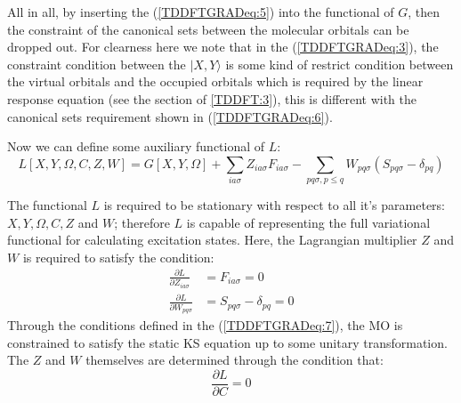 All in all, by inserting the (\ref{TDDFTGRADeq:5}) into the
functional of $G$, then the constraint of the canonical sets between
the molecular orbitals can be dropped out. For clearness here we
note that in the (\ref{TDDFTGRADeq:3}), the constraint condition
between the $|X,Y\rangle$ is some kind of restrict condition between
the virtual orbitals and the occupied orbitals which is required by
the linear response equation (see the section of \ref{TDDFT:3}),
this is different with the canonical sets requirement shown in
(\ref{TDDFTGRADeq:6}).

Now we can define some auxiliary functional of $L$:
\begin{equation}\label{}
L [X, Y, \Omega, C, Z ,W]  = G[X, Y, \Omega] +
\sum_{ia\sigma}Z_{ia\sigma}F_{ia\sigma} - \sum_{pq\sigma, p\leq
q}W_{pq\sigma}(S_{pq\sigma} - \delta_{pq})
\end{equation}

The functional $L$ is required to be stationary with respect to all
it's parameters: $X, Y, \Omega, C, Z$ and $W$; therefore $L$ is
capable of representing the full variational functional for
calculating excitation states. Here, the Lagrangian multiplier $Z$
and $W$ is required to satisfy the condition:
\begin{align}\label{TDDFTGRADeq:7}
\frac{\partial L}{\partial Z_{ia\sigma}} &= F_{ia\sigma} = 0
\nonumber \\
\frac{\partial L}{\partial W_{pq\sigma}} &= S_{pq\sigma} -
\delta_{pq} = 0
\end{align}
Through the conditions defined in the (\ref{TDDFTGRADeq:7}), the MO
is constrained to satisfy the static KS equation up to some unitary
transformation. The $Z$ and $W$ themselves are determined through
the condition that:
\begin{equation}\label{}
\frac{\partial L}{\partial C} = 0
\end{equation}

